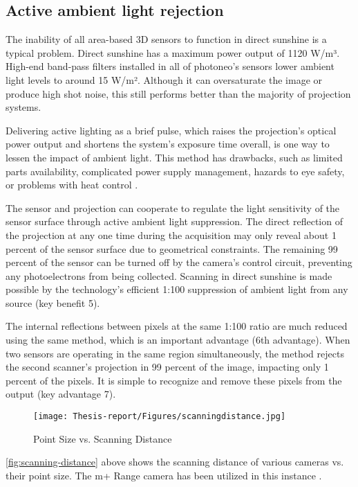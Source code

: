 \documentclass[12pt]{article}
\begin{document}
\subsection{Active ambient light rejection}
The inability of all area-based 3D sensors to function in direct sunshine is a typical problem.  Direct sunshine has a maximum power output of 1120 W/m³. High-end band-pass filters installed in all of photoneo's sensors lower ambient light levels to around 15 W/m².  Although it can oversaturate the image or produce high shot noise, this still performs better than the majority of projection systems.

Delivering active lighting as a brief pulse, which raises the projection's optical power output and shortens the system's exposure time overall, is one way to lessen the impact of ambient light.  This method has drawbacks, such as limited parts availability, complicated power supply management, hazards to eye safety, or problems with heat control \cite {ref15}.

The sensor and projection can cooperate to regulate the light sensitivity of the sensor surface through active ambient light suppression. The direct reflection of the projection at any one time during the acquisition may only reveal about 1 percent of the sensor surface due to geometrical constraints.  The remaining 99 percent of the sensor can be turned off by the camera's control circuit, preventing any photoelectrons from being collected.  Scanning in direct sunshine is made possible by the technology's efficient 1:100 suppression of ambient light from any source (key benefit 5)\cite{ref15}.

The internal reflections between pixels at the same 1:100 ratio are much reduced using the same method, which is an important advantage (6th advantage).   When two sensors are operating in the same region simultaneously, the method rejects the second scanner's projection in 99 percent of the image, impacting only 1 percent of the pixels. It is simple to recognize and remove these pixels from the output (key advantage 7)\cite{ref15}.
 
\begin{figure}[h]
    \centering
    \texttt{[image: Thesis-report/Figures/scanningdistance.jpg]}
    \caption{Point Size vs. Scanning Distance \cite{ref15}}
    \label{fig:scanning-distance}
\end{figure}

 \autoref{fig:scanning-distance} above shows the scanning distance of various cameras vs. their point size. The m+ Range camera has been utilized in this instance \cite{ref15}. 
\end{document}
